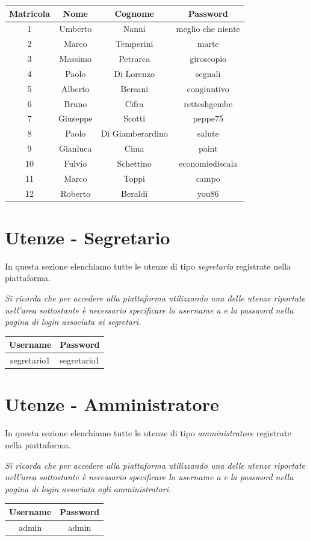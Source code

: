 \documentclass [a4paper,11pt]{book}
\begin{document}
\medskip

\begin{tabular}{|c|c|c|c|}
\hline
Matricola & Nome & Cognome & Password\\
\hline
1 & Umberto & Nanni & meglio che niente\\
\hline
2 & Marco & Temperini & marte \\
\hline
3 & Massimo & Petrarca & giroscopio\\
\hline
4 & Paolo & Di Lorenzo & segnali\\
\hline
5 & Alberto & Bersani & congiuntivo\\
\hline
6 & Bruno & Cifra & retteshgembe\\
\hline
7 & Giuseppe &  Scotti & peppe75\\
\hline
8 & Paolo & Di Giamberardino & salute\\
\hline
9 & Gianluca & Cima & paint\\
\hline
10 & Fulvio & Schettino & economiediscala\\
\hline
11& Marco & Toppi & campo\\
\hline
12 & Roberto & Beraldi & you86\\
\hline
\end{tabular}

\medskip

\section{Utenze - Segretario}

In questa sezione elenchiamo tutte le utenze di tipo \emph{segretario} registrate nella piattaforma.

\medskip

\emph{Si ricorda che per accedere alla piattaforma utilizzando una delle utenze riportate nell'area sottostante è necessario specificare lo username a e la password nella pagina di login associata ai segretari.}

\begin{tabular}{|c|c|}
\hline
Username & Password \\
\hline
segretario1 & segretario1 \\
\hline
\end{tabular}

\medskip

\section{Utenze - Amministratore}

In questa sezione elenchiamo tutte le utenze di tipo \emph{amministratore} registrate nella piattaforma. 

\medskip

\emph{Si ricorda che per accedere alla piattaforma utilizzando una delle utenze riportate nell'area sottostante è necessario specificare lo username a e la password nella pagina di login associata agli amministratori.}

\begin{tabular}{|c|c|}
\hline
Username & Password \\
\hline
admin & admin \\
\hline
\end{tabular}
\end{document}
